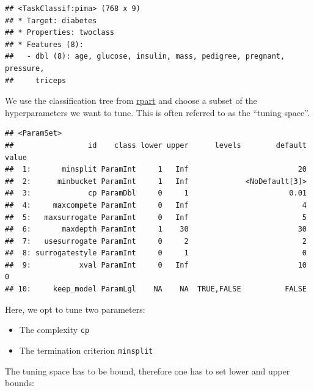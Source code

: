 \documentclass[]{scrbook}
\newenvironment{Shaded}{\begin{snugshade}}{\end{snugshade}}
\newcommand{\KeywordTok}[1]{\textcolor[rgb]{0.13,0.29,0.53}{\textbf{#1}}}
\newcommand{\NormalTok}[1]{#1}
\newcommand{\OperatorTok}[1]{\textcolor[rgb]{0.81,0.36,0.00}{\textbf{#1}}}
\newcommand{\StringTok}[1]{\textcolor[rgb]{0.31,0.60,0.02}{#1}}
\providecommand{\tightlist}{%
  \setlength{\itemsep}{0pt}\setlength{\parskip}{0pt}}
\renewenvironment{Shaded} {\begin{snugshade}\small} {\end{snugshade}}
\begin{document}
\begin{verbatim}
## <TaskClassif:pima> (768 x 9)
## * Target: diabetes
## * Properties: twoclass
## * Features (8):
##   - dbl (8): age, glucose, insulin, mass, pedigree, pregnant, pressure,
##     triceps
\end{verbatim}

We use the classification tree from \href{https://cran.r-project.org/package=rpart}{rpart} and choose a subset of the hyperparameters we want to tune.
This is often referred to as the ``tuning space''.

\begin{Shaded}
\end{Shaded}

\begin{verbatim}
## <ParamSet>
##                 id    class lower upper      levels        default value
##  1:       minsplit ParamInt     1   Inf                         20      
##  2:      minbucket ParamInt     1   Inf             <NoDefault[3]>      
##  3:             cp ParamDbl     0     1                       0.01      
##  4:     maxcompete ParamInt     0   Inf                          4      
##  5:   maxsurrogate ParamInt     0   Inf                          5      
##  6:       maxdepth ParamInt     1    30                         30      
##  7:   usesurrogate ParamInt     0     2                          2      
##  8: surrogatestyle ParamInt     0     1                          0      
##  9:           xval ParamInt     0   Inf                         10     0
## 10:     keep_model ParamLgl    NA    NA  TRUE,FALSE          FALSE
\end{verbatim}

Here, we opt to tune two parameters:

\begin{itemize}
\tightlist
\item
  The complexity \texttt{cp}
\item
  The termination criterion \texttt{minsplit}
\end{itemize}

The tuning space has to be bound, therefore one has to set lower and upper bounds:
\end{document}
